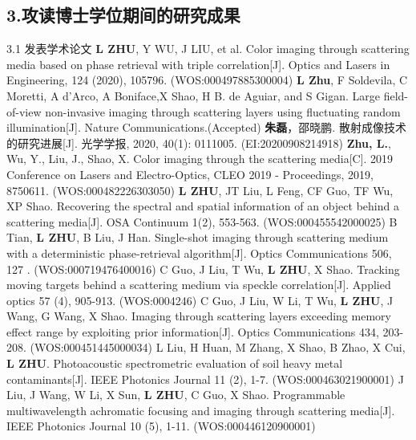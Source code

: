 \begin{resume}
\section*{3.\hspace{0.75em}攻读博士学位期间的研究成果}
\begin{resumelist}{\hspace{-0.25em}3.1\hspace{0.5em} 发表学术论文}
\resumelistitem \textbf{L ZHU}, Y WU, J LIU, et al. Color imaging through scattering media based on phase retrieval with triple correlation[J]. Optics and Lasers in Engineering, 124 (2020), 105796. (WOS:000497885300004)
\resumelistitem \textbf{L Zhu}, F Soldevila, C Moretti, A d'Arco, A Boniface,X Shao, H B. de Aguiar, and S Gigan. Large field-of-view non-invasive imaging through scattering layers using fluctuating random illumination[J]. Nature Communications.(Accepted)
\resumelistitem \textbf{朱磊}，邵晓鹏. 散射成像技术的研究进展[J]. 光学学报, 2020, 40(1): 0111005. (EI:20200908214918)
\resumelistitem \textbf{Zhu, L.}, Wu, Y., Liu, J., Shao, X. Color imaging through the scattering media[C]. 2019 Conference on Lasers and Electro-Optics, CLEO 2019 - Proceedings, 2019, 8750611. (WOS:000482226303050)
\resumelistitem \textbf{L ZHU}, JT Liu, L Feng, CF Guo, TF Wu, XP Shao. Recovering the spectral and spatial information of an object behind a scattering media[J]. OSA Continuum 1(2), 553-563. (WOS:000455542000025)
\resumelistitem B Tian, \textbf{L ZHU}, B Liu, J Han. Single-shot imaging through scattering medium with a deterministic phase-retrieval algorithm[J]. Optics Communications 506, 127 . (WOS:000719476400016)
\resumelistitem C Guo, J Liu, T Wu, \textbf{L ZHU}, X Shao. Tracking moving targets behind a scattering medium via speckle correlation[J]. Applied optics 57 (4), 905-913. (WOS:0004246)
\resumelistitem C Guo, J Liu, W Li, T Wu, \textbf{L ZHU}, J Wang, G Wang, X Shao. Imaging through scattering layers exceeding memory effect range by exploiting prior information[J]. Optics Communications 434, 203-208. (WOS:000451445000034)
\resumelistitem L Liu, H Huan, M Zhang, X Shao, B Zhao, X Cui, \textbf{L ZHU}. Photoacoustic spectrometric evaluation of soil heavy metal contaminants[J]. IEEE Photonics Journal 11 (2), 1-7. (WOS:000463021900001)
\resumelistitem J Liu, J Wang, W Li, X Sun, \textbf{L ZHU}, C Guo, X Shao. Programmable multiwavelength achromatic focusing and imaging through scattering media[J]. IEEE Photonics Journal 10 (5), 1-11. (WOS:000446120900001)
\end{resumelist}


\end{resume}
